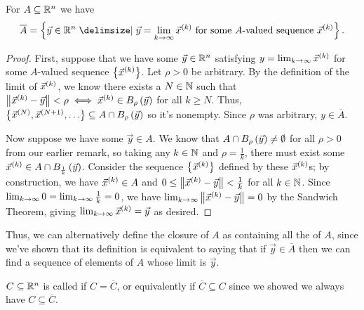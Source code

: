 \documentclass[main.tex]{subfiles}
\begin{document}
\begin{proposition}
    For $A\subseteq \mathbb R^n$ we have
    \[\overline{A} = \braces{\vec{y}\in \RR^n \mid \vec{y} = \limk \vseq{x}\text{ for some }A\text{-valued sequence } \vseq{x}}.\]
\end{proposition}

\begin{proof}
    First, suppose that we have some $\vec{y}\in \mathbb R^n$ satisfying $y = \lim_{k\to \infty} \vec{x}^{(k)}$ for some $A$-valued sequence $\left\{ \vec{x}^{(k)} \right\}$. Let $\rho > 0$ be arbitrary. By the definition of the limit of $\vec{x}^{(k)}$, we know there exists a $N\in \mathbb N$ such that $\left\lVert \vec{x}^{(k)} - \vec{y} \right\rVert < \rho\iff \vec{x}^{(k)}\in B_\rho\left( \vec{y} \right)$ for all $k\ge N$. Thus, $\left\{ \vec{x}^{(N)}, \vec{x}^{(N + 1)}, \ldots  \right\}\subseteq A\cap B_\rho\left( \vec{y} \right)$ so it's nonempty. Since $\rho$ was arbitrary, $y\in \overline{A}$.

    Now suppose we have some $\vec{y}\in A$. We know that $A\cap B_\rho\left( \vec{y} \right) \neq \emptyset$ for all $\rho > 0$ from our earlier remark, so taking any $k\in \mathbb N$ and $\rho = \frac{1}{k}$, there must exist some $\vec{x}^{(k)}\in A\cap B_{\frac{1}{k}}\left( \vec{y} \right)$. Consider the sequence $\left\{ \vec{x}^{(k)} \right\}$ defined by these $\vec{x}^{(k)}$s; by construction, we have $\vec{x}^{(k)}\in A$ and $0\le \left\lVert \vec{x}^{(k)} - \vec{y} \right\rVert < \frac{1}{k}$ for all $k\in \mathbb N$. Since $\lim_{k\to \infty} 0 = \lim_{k\to \infty} \frac{1}{k} = 0$, we have $\lim_{k\to \infty} \left\lVert \vec{x}^{(k)} - \vec{y} \right\rVert = 0$ by the Sandwich Theorem, giving $\lim_{k\to \infty} \vec{x}^{(k)} = \vec{y}$ as desired.
\end{proof}

Thus, we can alternatively define the closure of $A$ as containing all the  of $A$, since we've shown that its definition is equivalent to saying that if $\vec{y}\in \overline{A}$ then we can find a sequence of elements of $A$ whose limit is $\vec{y}$.

\begin{definition}
    $C\subseteq \mathbb R^n$ is called  if $C = \overline{C}$, or equivalently if $\overline{C}\subseteq C$ since we showed we always have $C\subseteq \overline{C}$.
\end{definition}
\end{document}
